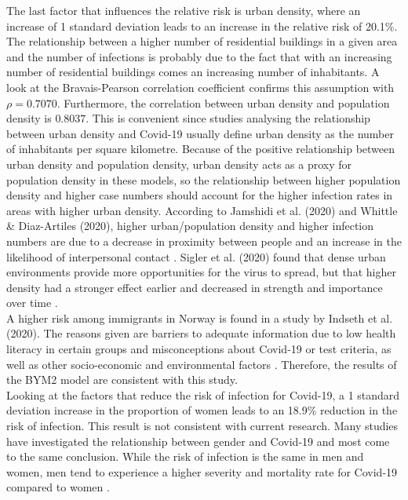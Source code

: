 The last factor that influences the relative risk is urban density, where an increase of 1 standard deviation leads to an increase in the relative risk of 20.1\%. The relationship between a higher number of residential buildings in a given area and the number of infections is probably due to the fact that with an increasing number of residential buildings comes an increasing number of inhabitants. A look at the Bravais-Pearson correlation coefficient confirms this assumption with $\rho=0.7070$. Furthermore, the correlation between urban density and population density is $0.8037$. This is convenient since studies analysing the relationship between urban density and Covid-19 usually define urban density as the number of inhabitants per square kilometre. Because of the positive relationship between urban density and population density, urban density acts as a proxy for population density in these models, so the relationship between higher population density and higher case numbers should account for the higher infection rates in areas with higher urban density. According to Jamshidi et al. (2020) and Whittle \& Diaz-Artiles (2020), higher urban/population density and higher infection numbers are due to a decrease in proximity between people and an increase in the likelihood of interpersonal contact \autocite[][]{jamshidi2020global, whittle2020ecological}. Sigler et al. (2020) found that dense urban environments provide more opportunities for the virus to spread, but that higher density had a stronger effect earlier and decreased in strength and importance over time \autocite[][]{sigler2020socio}. \\
A higher risk among immigrants in Norway is found in a study by Indseth et al. (2020). The reasons given are barriers to adequate information due to low health literacy in certain groups and misconceptions about Covid-19 or test criteria, as well as other socio-economic and environmental factors \autocite[][]{indseth2020covid}. Therefore, the results of the BYM2 model are consistent with this study. \\
Looking at the factors that reduce the risk of infection for Covid-19, a 1 standard deviation increase in the proportion of women leads to an 18.9\% reduction in the risk of infection. This result is not consistent with current research.  Many studies have investigated the relationship between gender and Covid-19 and most come to the same conclusion. While the risk of infection is the same in men and women, men tend to experience a higher severity and mortality rate for Covid-19 compared to women \autocite[][]{mukherjee2021covid, gausman2020sex, spagnolo2020sex, kopel2020racial}. \\

